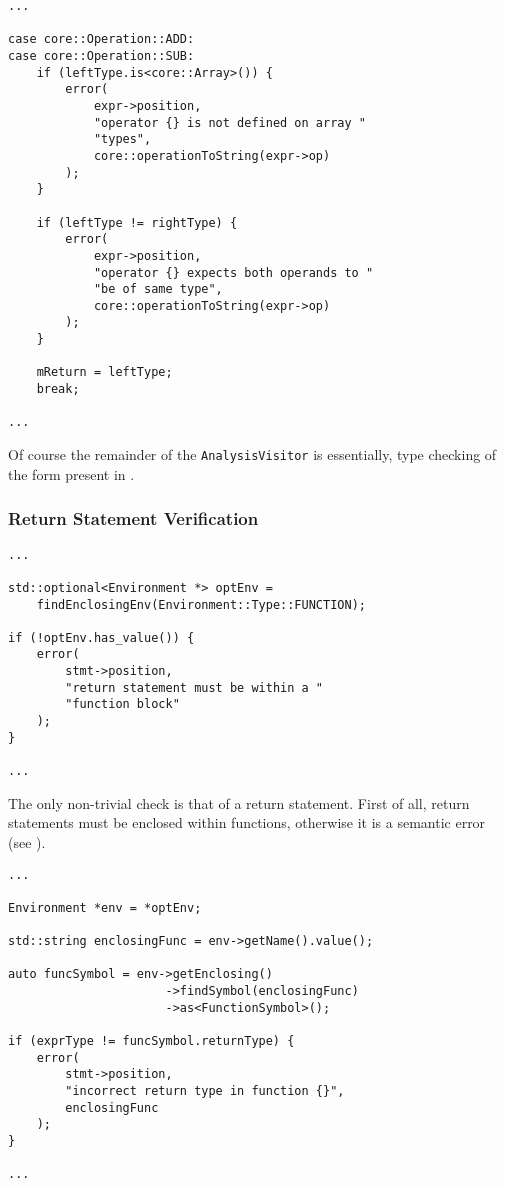 \begin{lstlisting}[caption={Another part of the
\texttt{visit(Binary *)} method in the \texttt{AnalysisVisitor}
class (analysis/AnalysisVisitor.cpp).},label=lst:typechecking2]
...

case core::Operation::ADD:
case core::Operation::SUB:
    if (leftType.is<core::Array>()) {
        error(
            expr->position,
            "operator {} is not defined on array "
            "types",
            core::operationToString(expr->op)
        );
    }

    if (leftType != rightType) {
        error(
            expr->position,
            "operator {} expects both operands to "
            "be of same type",
            core::operationToString(expr->op)
        );
    }

    mReturn = leftType;
    break;

...
\end{lstlisting}

Of course the remainder of the \texttt{AnalysisVisitor} is
essentially, type checking of the form present in
.

\subsubsection{Return Statement Verification}

\begin{lstlisting}[caption={Checking whether a return statement
is inside a function declaration in the \texttt{visit(ReturnStmt
*)} method in the \texttt{AnalysisVisitor} class
(analysis/AnalysisVisitor.cpp).},label=lst:returninsidefunc]
...

std::optional<Environment *> optEnv =
    findEnclosingEnv(Environment::Type::FUNCTION);

if (!optEnv.has_value()) {
    error(
        stmt->position,
        "return statement must be within a "
        "function block"
    );
}

...
\end{lstlisting}

The only non-trivial check is that of a return statement. First
of all, return statements must be enclosed within functions,
otherwise it is a semantic error (see
).

\begin{lstlisting}[caption={Checking whether the return
expression has the same type as the function return type in the
\texttt{visit(ReturnStmt *)} method in the
\texttt{AnalysisVisitor} class
(analysis/AnalysisVisitor.cpp).},label=lst:returntype]
...

Environment *env = *optEnv;

std::string enclosingFunc = env->getName().value();

auto funcSymbol = env->getEnclosing()
                      ->findSymbol(enclosingFunc)
                      ->as<FunctionSymbol>();

if (exprType != funcSymbol.returnType) {
    error(
        stmt->position,
        "incorrect return type in function {}",
        enclosingFunc
    );
}

...
\end{lstlisting}

